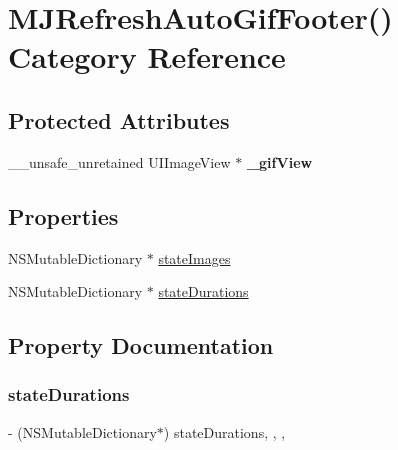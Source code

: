 \hypertarget{category_m_j_refresh_auto_gif_footer_07_08}{}\section{M\+J\+Refresh\+Auto\+Gif\+Footer() Category Reference}
\label{category_m_j_refresh_auto_gif_footer_07_08}
\subsection*{Protected Attributes}
\begin{DoxyCompactItemize}
\item 
\mbox{\label{category_m_j_refresh_auto_gif_footer_07_08_ac1a56402c3127b7fa2577a5f709241b7}} 
\+\_\+\+\_\+unsafe\+\_\+unretained U\+I\+Image\+View $\ast$ {\bfseries \+\_\+gif\+View}
\end{DoxyCompactItemize}
\subsection*{Properties}
\begin{DoxyCompactItemize}
\item 
N\+S\+Mutable\+Dictionary $\ast$ \mbox{\hyperlink{category_m_j_refresh_auto_gif_footer_07_08_aeb717f20369197cca94ee78bed65bade}{state\+Images}}
\item 
N\+S\+Mutable\+Dictionary $\ast$ \mbox{\hyperlink{category_m_j_refresh_auto_gif_footer_07_08_a5173fb96abaf0f94c3f1e2450a0ae076}{state\+Durations}}
\end{DoxyCompactItemize}


\subsection{Property Documentation}
\mbox{\label{category_m_j_refresh_auto_gif_footer_07_08_a5173fb96abaf0f94c3f1e2450a0ae076}} 
\subsubsection{\texorpdfstring{state\+Durations}{stateDurations}}
{\footnotesize\ttfamily -\/ (N\+S\+Mutable\+Dictionary$\ast$) state\+Durations\hspace{0.3cm}{\ttfamily [read]}, {\ttfamily [write]}, {\ttfamily [nonatomic]}, {\ttfamily [strong]}}

